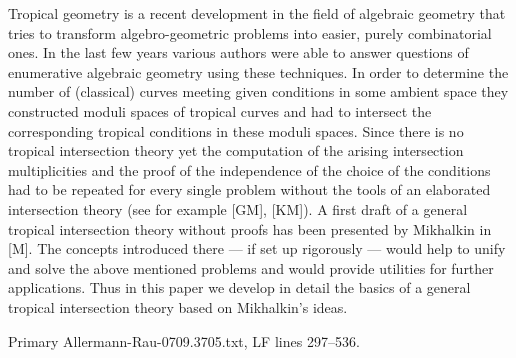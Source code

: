 \documentclass[
  11pt,
]{article}
\newenvironment{Shaded}{}{}
\newcommand{\NormalTok}[1]{#1}
\begin{document}
\begin{Shaded}
\begin{Highlighting}[]
\NormalTok{                                          Tropical geometry is a recent development in the field of algebraic geometry that tries}
\NormalTok{                                          to transform algebro{-}geometric problems into easier, purely combinatorial ones. In the}
\NormalTok{                                          last few years various authors were able to answer questions of enumerative algebraic}
\NormalTok{                                          geometry using these techniques. In order to determine the number of (classical) curves}
\NormalTok{                                          meeting given conditions in some ambient space they constructed moduli spaces of tropical}
\NormalTok{                                          curves and had to intersect the corresponding tropical conditions in these moduli spaces.}
\NormalTok{                                          Since there is no tropical intersection theory yet the computation of the arising intersection}
\NormalTok{                                          multiplicities and the proof of the independence of the choice of the conditions had to be}
\NormalTok{                                          repeated for every single problem without the tools of an elaborated intersection theory}
\NormalTok{                                          (see for example [GM], [KM]).}
\NormalTok{                                          A first draft of a general tropical intersection theory without proofs has been presented}
\NormalTok{                                          by Mikhalkin in [M]. The concepts introduced there — if set up rigorously — would}
\NormalTok{                                          help to unify and solve the above mentioned problems and would provide utilities for}
\NormalTok{                                          further applications. Thus in this paper we develop in detail the basics of a general tropical}
\NormalTok{                                          intersection theory based on Mikhalkin’s ideas.}
\end{Highlighting}
\end{Shaded}

Primary Allermann-Rau-0709.3705.txt, LF lines 297--536.
\end{document}

